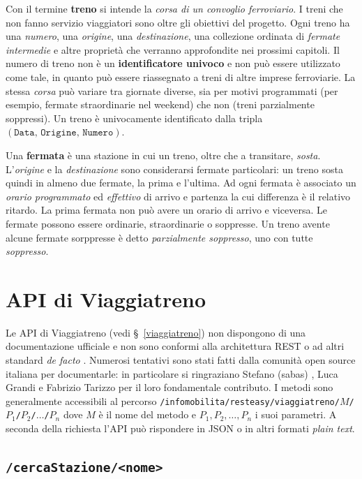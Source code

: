 \documentclass[12pt,a4paper,italian]{report}
\begin{document}
Con il termine \textbf{treno} si intende la \textit{corsa di un
    convoglio ferroviario}.  I treni che non fanno servizio
viaggiatori sono oltre gli obiettivi del progetto.  Ogni treno ha una
\textit{numero}, una \textit{origine}, una \textit{destinazione}, una
collezione ordinata di \textit{fermate intermedie} e altre proprietà
che verranno approfondite nei prossimi capitoli.  Il numero di treno
non è un \textbf{identificatore univoco} e non può essere utilizzato
come tale, in quanto può essere riassegnato a treni di altre imprese
ferroviarie.  La stessa \textit{corsa} può variare tra giornate
diverse, sia per motivi programmati (per esempio, fermate
straordinarie nel weekend) che non (treni parzialmente soppressi).  Un
treno è univocamente identificato dalla tripla
$(\texttt{Data}, \, \texttt{Origine}, \, \texttt{Numero})$.

Una \textbf{fermata} è una stazione in cui un treno, oltre che a
transitare, \textit{sosta}.  L'\textit{origine} e la
\textit{destinazione} sono considerarsi fermate particolari: un treno
sosta quindi in almeno due fermate, la prima e l'ultima.  Ad ogni
fermata è associato un \textit{orario programmato} ed
\textit{effettivo} di arrivo e partenza la cui differenza è il
relativo ritardo.  La prima fermata non può avere un orario di arrivo
e viceversa.  Le fermate possono essere ordinarie, straordinarie o
soppresse.  Un treno avente alcune fermate sorppresse è detto
\textit{parzialmente soppresso}, uno con tutte \textit{soppresso}.

\section{API di Viaggiatreno}

Le API di Viaggiatreno (vedi \S~\ref{viaggiatreno}) non dispongono di
una documentazione ufficiale e non sono conformi alla architettura
REST o ad altri standard \textit{de facto} \cite{Giunta}.  Numerosi
tentativi sono stati fatti dalla comunità open source italiana per
documentarle: in particolare si ringraziano Stefano (sabas)
\cite{Sabas}, Luca Grandi \cite{Grandi} e Fabrizio Tarizzo
\cite{Tarizzo} per il loro fondamentale contributo.  I metodi sono
generalmente accessibili al percorso
\texttt{/infomobilita/\-resteasy/\-viaggiatreno/\-$M$/\-$P_1$/\-$P_2$/\-$\dots$/\-$P_n$}
dove $M$ è il nome del metodo e $P_1, P_2, \dots, P_n$ i suoi
parametri. A seconda della richiesta l'API può rispondere in JSON o in
altri formati \textit{plain text}.


\subsection{\texttt{/cercaStazione/<nome>}}
\label{cercaStazione}
\end{document}
